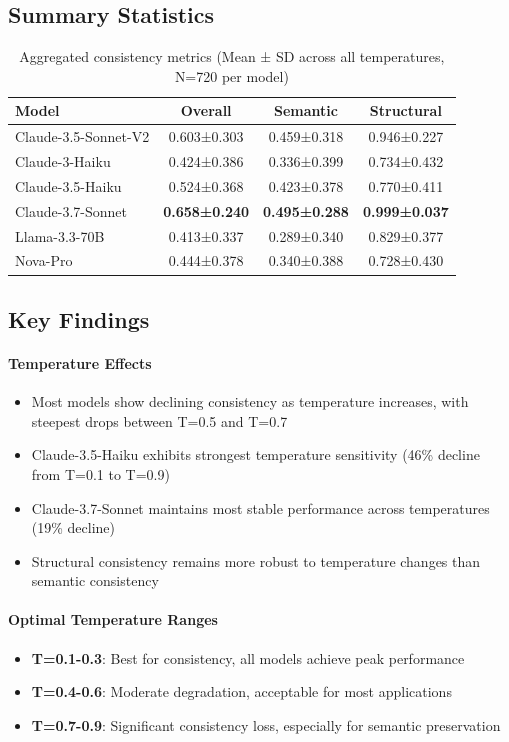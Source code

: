 \documentclass{article}
\begin{document}
\subsection{Summary Statistics}

\begin{table}[H]
\centering
\caption{Aggregated consistency metrics (Mean ± SD across all temperatures, N=720 per model)}
\label{tab:consistency-summary}
\begin{tabular}{lccc}
\toprule
\textbf{Model} & \textbf{Overall} & \textbf{Semantic} & \textbf{Structural} \\
\midrule
Claude-3.5-Sonnet-V2 & 0.603±0.303 & 0.459±0.318 & 0.946±0.227 \\
Claude-3-Haiku & 0.424±0.386 & 0.336±0.399 & 0.734±0.432 \\
Claude-3.5-Haiku & 0.524±0.368 & 0.423±0.378 & 0.770±0.411 \\
Claude-3.7-Sonnet & \textbf{0.658±0.240} & \textbf{0.495±0.288} & \textbf{0.999±0.037} \\
Llama-3.3-70B & 0.413±0.337 & 0.289±0.340 & 0.829±0.377 \\
Nova-Pro & 0.444±0.378 & 0.340±0.388 & 0.728±0.430 \\
\bottomrule
\end{tabular}
\end{table}

\subsection{Key Findings}

\paragraph{Temperature Effects}
\begin{itemize}
\item Most models show declining consistency as temperature increases, with steepest drops between T=0.5 and T=0.7
\item Claude-3.5-Haiku exhibits strongest temperature sensitivity (46\% decline from T=0.1 to T=0.9)
\item Claude-3.7-Sonnet maintains most stable performance across temperatures (19\% decline)
\item Structural consistency remains more robust to temperature changes than semantic consistency
\end{itemize}

\paragraph{Optimal Temperature Ranges}
\begin{itemize}
\item \textbf{T=0.1-0.3}: Best for consistency, all models achieve peak performance
\item \textbf{T=0.4-0.6}: Moderate degradation, acceptable for most applications
\item \textbf{T=0.7-0.9}: Significant consistency loss, especially for semantic preservation
\end{itemize}
\end{document}

